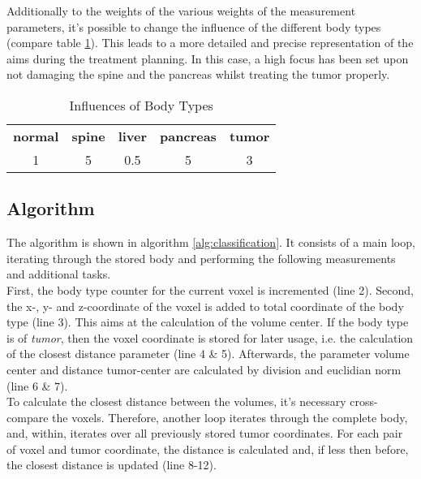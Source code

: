 Additionally to the weights of the various weights of the measurement parameters, it's possible to change the influence of the different body types (compare table \ref{tbl:classification_type_weights}). This leads to a more detailed and precise representation of the aims during the treatment planning. In this case, a high focus has been set upon not damaging the spine and the pancreas whilst treating the tumor properly. 

\begin{table}
\centering
\caption{Influences of Body Types}
\begin{tabular}[htbp]{c | c | c | c | c}
\textbf{normal} & \textbf{spine} & \textbf{liver} & \textbf{pancreas} & \textbf{tumor} \\
1 & 5 & 0.5 & 5 & 3
\end{tabular}
\label{tbl:classification_type_weights}
\end{table}

\subsection{Algorithm}\label{classification:algorithm}
The algorithm is shown in algorithm \ref{alg:classification}. It consists of a main loop, iterating through the stored body and performing the following measurements and additional tasks. \\
First, the body type counter for the current voxel is incremented (line 2). Second, the x-, y- and z-coordinate of the voxel is added to total coordinate of the body type (line 3). This aims at the calculation of the volume center. If the body type is of \textit{tumor}, then the voxel coordinate is stored for later usage, i.e. the calculation of the closest distance parameter (line 4 \& 5). Afterwards, the parameter volume center and distance tumor-center are calculated by division and euclidian norm (line 6 \& 7).\\
To calculate the closest distance between the volumes, it's necessary cross-compare the voxels. Therefore, another loop iterates through the complete body, and, within, iterates over all previously stored tumor coordinates. For each pair of voxel and tumor coordinate, the distance is calculated and, if less then before, the closest distance is updated (line 8-12).


